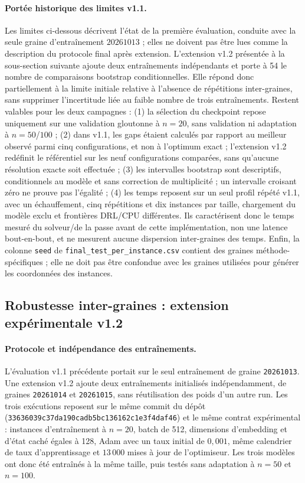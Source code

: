 \documentclass[12pt, a4paper, twoside, openright]{book}
\begin{document}
\paragraph{Portée historique des limites v1.1.}
Les limites ci-dessous décrivent l'état de la première évaluation, conduite avec
la seule graine d'entraînement $20261013$ ; elles ne doivent pas être lues comme
la description du protocole final après extension. L'extension v1.2 présentée
à la sous-section suivante ajoute deux entraînements indépendants et porte à
54 le nombre de comparaisons bootstrap conditionnelles. Elle répond donc
partiellement à la limite initiale relative à l'absence de répétitions
inter-graines, sans supprimer l'incertitude liée au faible nombre de trois
entraînements. Restent valables pour les deux campagnes : (1) la sélection du
checkpoint repose uniquement sur une validation gloutonne à $n=20$, sans
validation ni adaptation à $n=50$/$100$ ; (2) dans v1.1, les gaps étaient
calculés par rapport au meilleur observé parmi cinq configurations, et non à
l'optimum exact ; l'extension v1.2 redéfinit le référentiel sur les neuf
configurations comparées, sans qu'aucune résolution exacte soit effectuée ;
(3) les intervalles bootstrap sont descriptifs, conditionnels au modèle et
sans correction de multiplicité ; un intervalle croisant zéro ne prouve pas
l'égalité ; (4) les temps reposent sur un seul profil répété v1.1, avec un
échauffement, cinq répétitions et dix instances par taille, chargement du
modèle exclu et frontières DRL/CPU différentes. Ils caractérisent donc le
temps mesuré du solveur/de la passe avant de cette implémentation, non une
latence bout-en-bout, et ne mesurent aucune dispersion inter-graines des
temps. Enfin, la colonne \texttt{seed} de
\texttt{final\_test\_per\_instance.csv} contient des graines
méthode-spécifiques ; elle ne doit pas être confondue avec les graines
utilisées pour générer les coordonnées des instances.



\subsection{Robustesse inter-graines : extension expérimentale v1.2}
\label{sec:eval-multiseed}

\paragraph{Protocole et indépendance des entraînements.}
L'évaluation v1.1 précédente portait sur le seul entraînement de graine
\texttt{20261013}. Une extension v1.2 ajoute deux entraînements initialisés
indépendamment, de graines \texttt{20261014} et \texttt{20261015}, sans
réutilisation des poids d'un autre run. Les trois exécutions reposent sur le
même commit du dépôt (\texttt{33636039c37da190cadb5bc136162c1e3f4daf46}) et
le même contrat expérimental : instances d'entraînement à $n=20$, batch de
512, dimensions d'embedding et d'état caché égales à 128, Adam avec un taux
initial de $0{,}001$, même calendrier de taux d'apprentissage et
$13\,000$ mises à jour de l'optimiseur. Les trois modèles ont donc été
entraînés à la même taille, puis testés sans adaptation à $n=50$ et $n=100$.
\end{document}

